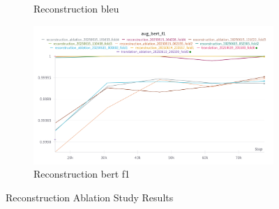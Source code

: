 \documentclass[letterpaper]{article} %
\begin{document}
\begin{figure}[ht]
\begin{subfigure}[b]{0.45\textwidth}
        \caption{Reconstruction bleu}
        \label{fig:recon_bleu}
    \end{subfigure}
    \begin{subfigure}[b]{0.45\textwidth}
        \centering
        \includegraphics[width=\textwidth]{figures/recon_bert_f1.png}
        \caption{Reconstruction bert f1}
        \label{fig:recon_bert_f1}
    \end{subfigure}
    \caption{Reconstruction Ablation Study Results}
    \label{fig:recon_results}
\end{figure}
\end{document}
